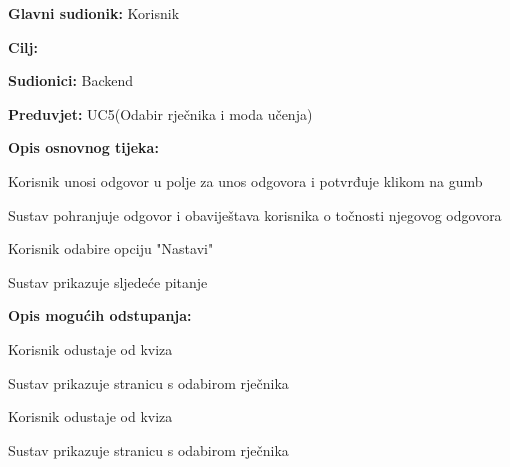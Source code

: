					\noindent {}
					\begin{packed_item}
						
						\item \textbf{Glavni sudionik: } Korisnik
						\item  \textbf{Cilj:} 
						\item  \textbf{Sudionici:} Backend
						\item  \textbf{Preduvjet:} UC5(Odabir rječnika i moda učenja)
						\item  \textbf{Opis osnovnog tijeka:}
						
						\item[] \begin{packed_enum}
							
							\item Korisnik unosi odgovor u polje za unos odgovora i potvrđuje klikom na gumb
							\item Sustav pohranjuje odgovor i obaviještava korisnika o točnosti njegovog odgovora
							\item Korisnik odabire opciju "Nastavi"
							\item Sustav prikazuje sljedeće pitanje
						\end{packed_enum}
						
						\item  \textbf{Opis mogućih odstupanja:}
						
						\item[] \begin{packed_item}
							
							\item[3.a] Korisnik odustaje od kviza
							\item[] \begin{packed_enum}
								
								\item Sustav prikazuje stranicu s odabirom rječnika
								
							\end{packed_enum}
							
							\item[4.a] Korisnik odustaje od kviza 
							\item[] \begin{packed_enum}
								
								\item Sustav prikazuje stranicu s odabirom rječnika
								
							\end{packed_enum}
							
						\end{packed_item}
					\end{packed_item}
					
